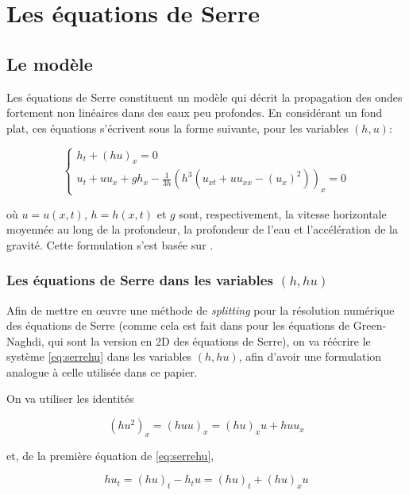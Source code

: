\section{Les équations de Serre}
\label{sec:Serre}

\subsection{Le modèle}

\indent Les équations de Serre constituent un modèle qui décrit la propagation des ondes fortement non linéaires dans des eaux peu profondes. En considérant un fond plat, ces équations s'écrivent sous la forme suivante, pour les variables $(h,u)$:

\begin{equation}
\label{eq:serrehu}
\begin{cases}
h_t + (hu)_x = 0 \\
u_t + uu_x + gh_x - \frac{1}{3h}\left(h^3 \left( u_{xt} + uu_{xx} - (u_x)^2  \right) \right)_x = 0
\end{cases}
\end{equation}

\noindent où $u = u(x,t)$, $h = h(x,t)$ et $g$ sont, respectivement, la vitesse horizontale moyennée au long de la profondeur, la profondeur de l'eau et l'accélération de la gravité. Cette formulation s'est basée sur \cite{CarterCienfuegos2011}.

\subsubsection{Les équations de Serre dans les variables $(h,hu)$}

\indent Afin de mettre en œuvre une méthode de \emph{splitting} pour la résolution numérique des équations de Serre (comme cela est fait dans \cite{Bonneton2011} pour les équations de Green-Naghdi, qui sont la version en 2D des équations de Serre), on va réécrire le système \eqref{eq:serrehu} dans les variables $(h,hu)$, afin d'avoir une formulation analogue à celle utilisée dans ce papier.

\indent On va utiliser les identités

\begin{equation*}
	(hu^2)_x = (huu)_x = (hu)_xu + huu_x
\end{equation*}

\noindent et, de la première équation de \eqref{eq:serrehu},

\begin{equation*}
	hu_t = (hu)_t - h_tu = (hu)_t +  (hu)_xu
\end{equation*}

